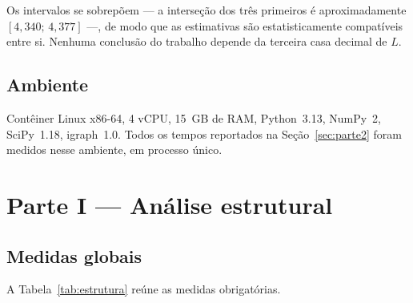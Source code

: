 \documentclass[sigconf]{webmedia}
\begin{document}
\noindent
Os intervalos se sobrepõem --- a interseção dos três primeiros é
aproximadamente $[4{,}340;\,4{,}377]$ ---, de modo que as estimativas são
estatisticamente compatíveis entre si. Nenhuma conclusão do trabalho depende da terceira
casa decimal de $L$.

\subsection{Ambiente}

Contêiner Linux x86-64, 4 vCPU, 15~GB de RAM, Python~3.13, NumPy~2,
SciPy~1.18, igraph~1.0. Todos os tempos reportados na
Seção~\ref{sec:parte2} foram medidos nesse ambiente, em processo único.

\section{Parte I --- Análise estrutural}
\label{sec:parte1}

\subsection{Medidas globais}

A Tabela~\ref{tab:estrutura} reúne as medidas obrigatórias.
\end{document}

